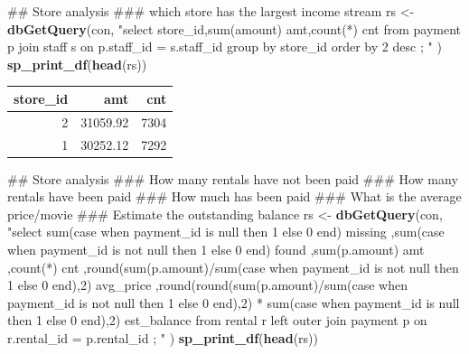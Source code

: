 \documentclass[]{book}
\newenvironment{Shaded}{\begin{snugshade}}{\end{snugshade}}
\newcommand{\KeywordTok}[1]{\textcolor[rgb]{0.13,0.29,0.53}{\textbf{#1}}}
\newcommand{\NormalTok}[1]{#1}
\newcommand{\StringTok}[1]{\textcolor[rgb]{0.31,0.60,0.02}{#1}}
\theoremstyle{definition}
\theoremstyle{definition}
\theoremstyle{definition}
\theoremstyle{remark}
\begin{document}
\begin{Shaded}
\begin{Highlighting}[]
\NormalTok{## Store analysis}
\NormalTok{### which store has the largest income stream}
\NormalTok{rs <-}\StringTok{ }\KeywordTok{dbGetQuery}\NormalTok{(con,}
                \StringTok{"select store_id,sum(amount) amt,count(*) cnt }
\StringTok{                   from payment p }
\StringTok{                        join staff s }
\StringTok{                          on p.staff_id = s.staff_id  }
\StringTok{                 group by store_id order by 2 desc}
\StringTok{                 ;}
\StringTok{                "}
\NormalTok{                )}
\KeywordTok{sp_print_df}\NormalTok{(}\KeywordTok{head}\NormalTok{(rs))}
\end{Highlighting}
\end{Shaded}

\begin{tabular}{r|r|r}
\hline
store\_id & amt & cnt\\
\hline
2 & 31059.92 & 7304\\
\hline
1 & 30252.12 & 7292\\
\hline
\end{tabular}

\begin{Shaded}
\begin{Highlighting}[]
\NormalTok{## Store analysis}
\NormalTok{### How many rentals have not been paid}
\NormalTok{### How many rentals have been paid}
\NormalTok{### How much has been paid}
\NormalTok{### What is the average price/movie}
\NormalTok{### Estimate the outstanding balance}
\NormalTok{rs <-}\StringTok{ }\KeywordTok{dbGetQuery}\NormalTok{(con,}
                \StringTok{"select sum(case when payment_id is null then 1 else 0 end) missing}
\StringTok{                       ,sum(case when payment_id is not null then 1 else 0 end) found}
\StringTok{                       ,sum(p.amount) amt}
\StringTok{                       ,count(*) cnt }
\StringTok{                       ,round(sum(p.amount)/sum(case when payment_id is not null then 1 else 0 end),2) avg_price}
\StringTok{                       ,round(round(sum(p.amount)/sum(case when payment_id is not null then 1 else 0 end),2)}
\StringTok{                                  * sum(case when payment_id is null then 1 else 0 end),2) est_balance}
\StringTok{                   from rental r }
\StringTok{                        left outer join payment p }
\StringTok{                          on r.rental_id = p.rental_id  }
\StringTok{                 ;}
\StringTok{                "}
\NormalTok{                )}
\KeywordTok{sp_print_df}\NormalTok{(}\KeywordTok{head}\NormalTok{(rs))}
\end{Highlighting}
\end{Shaded}
\end{document}
